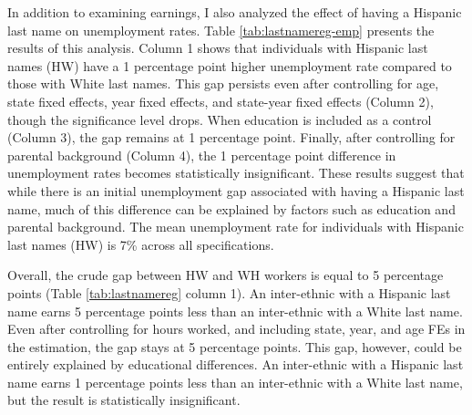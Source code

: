 In addition to examining earnings, I also analyzed the effect of having a Hispanic last name on unemployment rates. Table \ref{tab:lastnamereg-emp} presents the results of this analysis. Column 1 shows that individuals with Hispanic last names (HW) have a 1 percentage point higher unemployment rate compared to those with White last names. This gap persists even after controlling for age, state fixed effects, year fixed effects, and state-year fixed effects (Column 2), though the significance level drops. When education is included as a control (Column 3), the gap remains at 1 percentage point. Finally, after controlling for parental background (Column 4), the 1 percentage point difference in unemployment rates becomes statistically insignificant. These results suggest that while there is an initial unemployment gap associated with having a Hispanic last name, much of this difference can be explained by factors such as education and parental background. The mean unemployment rate for individuals with Hispanic last names (HW) is 7\% across all specifications.

Overall, the crude gap between HW and WH workers is equal to 5 percentage points (Table \ref{tab:lastnamereg} column 1). An inter-ethnic with a Hispanic last name earns 5 percentage points less than an inter-ethnic with a White last name. Even after controlling for hours worked, and including state, year, and age FEs in the estimation, the gap stays at 5 percentage points. This gap, however, could be entirely explained by educational differences. An inter-ethnic with a Hispanic last name earns 1 percentage points less than an inter-ethnic with a White last name, but the result is statistically insignificant. 


